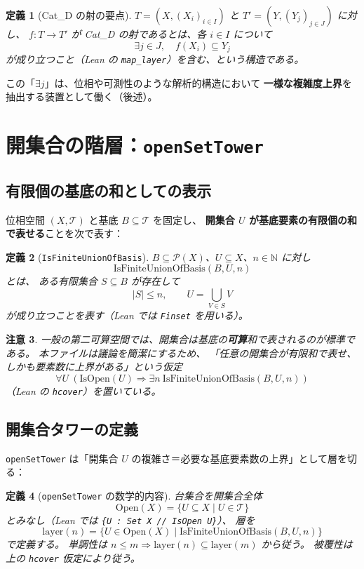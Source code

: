 \documentclass[a4paper,11pt]{article}
\newtheorem{definition}{定義}[section]
\newtheorem{remark}[definition]{注意}
\begin{document}
\begin{definition}[Cat\_D の射の要点]
$T=(X,(X_i)_{i\in I})$ と $T'=(Y,(Y_j)_{j\in J})$ に対し、
$f:T\to T'$ が Cat\_D の射であるとは、各 $i\in I$ について
\[
\exists j\in J,\quad f(X_i)\subseteq Y_j
\]
が成り立つこと（Lean の \texttt{map\_layer}）を含む、という構造である。
\end{definition}

この「$\exists j$」は、位相や可測性のような解析的構造において
\textbf{一様な複雑度上界}を抽出する装置として働く（後述）。

\section{開集合の階層：\texttt{openSetTower}}

\subsection{有限個の基底の和としての表示}
位相空間 $(X,\mathcal{T})$ と基底 $B\subseteq \mathcal{T}$ を固定し、
\textbf{開集合 $U$ が基底要素の有限個の和で表せる}ことを次で表す：

\begin{definition}[\texttt{IsFiniteUnionOfBasis}]
$B\subseteq \mathcal{P}(X)$、$U\subseteq X$、$n\in\mathbb{N}$ に対し
\[
\mathrm{IsFiniteUnionOfBasis}(B,U,n)
\]
とは、
ある有限集合 $S\subseteq B$ が存在して
\[
|S|\le n,\qquad U=\bigcup_{V\in S} V
\]
が成り立つことを表す（Lean では \texttt{Finset} を用いる）。
\end{definition}

\begin{remark}
一般の第二可算空間では、開集合は基底の\textbf{可算}和で表されるのが標準である。
本ファイルは議論を簡潔にするため、
「任意の開集合が有限和で表せ、しかも要素数に上界がある」という仮定
\[
\forall U\ (\mathrm{IsOpen}(U)\Rightarrow \exists n\ \mathrm{IsFiniteUnionOfBasis}(B,U,n))
\]
（Lean の \texttt{hcover}）を置いている。
\end{remark}

\subsection{開集合タワーの定義}
\texttt{openSetTower} は「開集合 $U$ の複雑さ＝必要な基底要素数の上界」として層を切る：

\begin{definition}[\texttt{openSetTower} の数学的内容]
台集合を開集合全体
\[
\mathrm{Open}(X)=\{U\subseteq X\mid U\in\mathcal{T}\}
\]
とみなし（Lean では \texttt{\{U : Set X // IsOpen U\}}）、
層を
\[
\mathrm{layer}(n)=\{U\in \mathrm{Open}(X)\mid \mathrm{IsFiniteUnionOfBasis}(B,U,n)\}
\]
で定義する。
単調性は $n\le m\Rightarrow \mathrm{layer}(n)\subseteq\mathrm{layer}(m)$ から従う。
被覆性は上の \texttt{hcover} 仮定により従う。
\end{definition}
\end{document}
